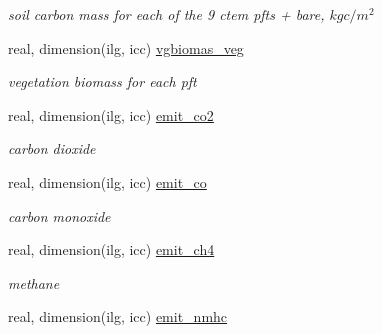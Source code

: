 \begin{DoxyCompactItemize}
\begin{DoxyCompactList}\small\item\em soil carbon mass for each of the 9 ctem pfts + bare, $kg c/m^2$ \end{DoxyCompactList}\item 
\hypertarget{structctem__statevars_1_1veg__gat_a73ed28a84449f1ac3d23857ce5d9239e}{}real, dimension(ilg, icc) \hyperlink{structctem__statevars_1_1veg__gat_a73ed28a84449f1ac3d23857ce5d9239e}{vgbiomas\+\_\+veg}\label{structctem__statevars_1_1veg__gat_a73ed28a84449f1ac3d23857ce5d9239e}

\begin{DoxyCompactList}\small\item\em vegetation biomass for each pft \end{DoxyCompactList}\item 
\hypertarget{structctem__statevars_1_1veg__gat_ad91957bf54b4241ece769a9b097c9db0}{}real, dimension(ilg, icc) \hyperlink{structctem__statevars_1_1veg__gat_ad91957bf54b4241ece769a9b097c9db0}{emit\+\_\+co2}\label{structctem__statevars_1_1veg__gat_ad91957bf54b4241ece769a9b097c9db0}

\begin{DoxyCompactList}\small\item\em carbon dioxide \end{DoxyCompactList}\item 
\hypertarget{structctem__statevars_1_1veg__gat_a67e9612c27cbbf467bd88cd1c2394fa1}{}real, dimension(ilg, icc) \hyperlink{structctem__statevars_1_1veg__gat_a67e9612c27cbbf467bd88cd1c2394fa1}{emit\+\_\+co}\label{structctem__statevars_1_1veg__gat_a67e9612c27cbbf467bd88cd1c2394fa1}

\begin{DoxyCompactList}\small\item\em carbon monoxide \end{DoxyCompactList}\item 
\hypertarget{structctem__statevars_1_1veg__gat_a9df4b3074575b082f7e00f1c25ada18a}{}real, dimension(ilg, icc) \hyperlink{structctem__statevars_1_1veg__gat_a9df4b3074575b082f7e00f1c25ada18a}{emit\+\_\+ch4}\label{structctem__statevars_1_1veg__gat_a9df4b3074575b082f7e00f1c25ada18a}

\begin{DoxyCompactList}\small\item\em methane \end{DoxyCompactList}\item 
\hypertarget{structctem__statevars_1_1veg__gat_a96a0bd1c024655d921895e2ec53424ca}{}real, dimension(ilg, icc) \hyperlink{structctem__statevars_1_1veg__gat_a96a0bd1c024655d921895e2ec53424ca}{emit\+\_\+nmhc}\label{structctem__statevars_1_1veg__gat_a96a0bd1c024655d921895e2ec53424ca}


\end{DoxyCompactItemize}
